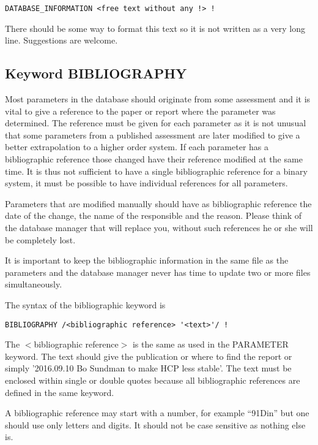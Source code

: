 \documentclass[12pt]{article}
\begin{document}
\begin{verbatim}
DATABASE_INFORMATION <free text without any !> !
\end{verbatim}

There should be some way to format this text so it is not written as a
very long line.  Suggestions are welcome.

\subsection{Keyword BIBLIOGRAPHY}\label{sec:bib}

Most parameters in the database should originate from some assessment
and it is vital to give a reference to the paper or report where the
parameter was determined.  The reference must be given for each
parameter as it is not unusual that some parameters from a published
assessment are later modified to give a better extrapolation to a
higher order system.  If each parameter has a bibliographic reference
those changed have their reference modified at the same time.  It is
thus not sufficient to have a single bibliographic reference for a
binary system, it must be possible to have individual references for
all parameters.

Parameters that are modified manually should have as bibliographic
reference the date of the change, the name of the responsible and the
reason.  Please think of the database manager that will replace you,
without such references he or she will be completely lost.

It is important to keep the bibliographic information in the same file
as the parameters and the database manager never has time to update
two or more files simultaneously.

The syntax of the bibliographic keyword is

\begin{verbatim}
BIBLIOGRAPHY /<bibliographic reference> '<text>'/ !
\end{verbatim}

The $<$bibliographic reference$>$ is the same as used in the PARAMETER
keyword.  The text should give the publication or where to find the
report or simply '2016.09.10 Bo Sundman to make HCP less stable'.  The
text must be enclosed within single or double quotes because all
bibliographic references are defined in the same keyword.

A bibliographic reference may start with a number, for example
``91Din'' but one should use only letters and digits.  It should not
be case sensitive as nothing else is.
\end{document}
